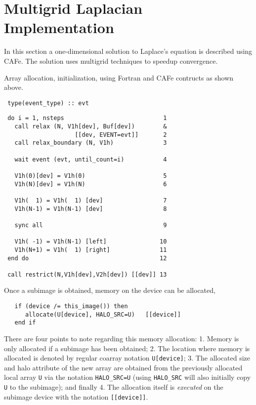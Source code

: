 \section{Multigrid Laplacian Implementation}

In this section a one-dimensional solution to Laplace's equation is described using CAFe.
The solution uses multigrid techniques to speedup convergence.

Array allocation, initialization, using Fortran and CAFe contructs as shown above.

\small
\begin{verbatim}
 type(event_type) :: evt
\end{verbatim}
\normalsize

\small
\begin{verbatim}
 do i = 1, nsteps                            1
   call relax (N, V1h[dev], Buf[dev])        &
                    [[dev, EVENT=evt]]       2
   call relax_boundary (N, V1h)              3

   wait event (evt, until_count=i)           4

   V1h(0)[dev] = V1h(0)                      5
   V1h(N)[dev] = V1h(N)                      6

   V1h(  1) = V1h(  1) [dev]                 7
   V1h(N-1) = V1h(N-1) [dev]                 8

   sync all                                  9

   V1h( -1) = V1h(N-1) [left]               10
   V1h(N+1) = V1h(  1) [right]              11
 end do                                     12

 call restrict(N,V1h[dev],V2h[dev]) [[dev]] 13
\end{verbatim}
\normalsize


Once a subimage is obtained, memory on the device can be allocated,
\small
\begin{verbatim}
   if (device /= this_image()) then
      allocate(U[device], HALO_SRC=U)   [[device]]
   end if
\end{verbatim}
\normalsize
There are four points to note regarding this memory allocation: 1. Memory is only allocated if a
subimage has been obtained; 2. The location where memory is allocated is denoted by regular coarray
notation \texttt{U[device]}; 3. The allocated size and halo attribute of the new array are obtained
from the previously allocated local array \texttt{U} via the notation \texttt{HALO\_SRC=U} (using
\texttt{HALO\_SRC} will also initially copy \texttt{U} to the subimage); and finally 4. The
allocation itself is \emph{executed} on the subimage device with the notation \texttt{[[device]]}.

